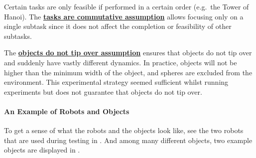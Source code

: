 Certain tasks are only feasible if performed in a certain order (e.g.~the Tower of Hanoi). The \hyperref[assumption:order_does_not_matter]{\textbf{tasks are commutative assumption}} allows focusing only on a single subtask since it does not affect the completion or feasibility of other subtasks.\bs

The \hyperref[assumption:no_tipping]{\textbf{objects do not tip over assumption}} ensures that objects do not tip over and suddenly have vastly different dynamics. In practice, objects will not be higher than the minimum width of the object, and spheres are excluded from the environment. This experimental strategy seemed sufficient whilst running experiments but does not guarantee that objects do not tip over.

\paragraph{An Example of Robots and Objects}
To get a sense of what the robots and the objects look like, see the two robots that are used during testing in . And among many different objects, two example objects are displayed in .

